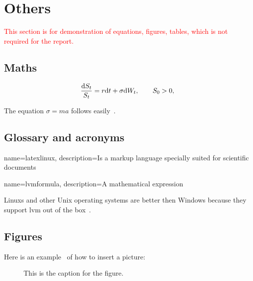 \section{Others}
\textcolor{red}{This section is for demonstration of equations, figures, tables, which is not required for the report.}
\subsection{Maths}
\begin{equation}\label{eq:BS}
\frac{\mathrm{d} S_t}{S_t} = r \mathrm{d} t + \sigma \mathrm{d} W_t,
\qquad S_0>0,
\end{equation}

The equation $\sigma = m a$ follows easily~\cite{Doe11}.


\subsection{Glossary and acronyms}

{
    name=latexlinux,
    description={Is a markup language specially suited for 
scientific documents}
}

{
    name=lvmformula,
    description={A mathematical expression}
}

\Glspl{Linux} and other Unix operating systems are better then Windows because they support \gls{lvm} out of the box~\cite{Joh11}. 

\subsection{Figures}
Here is an example~\cite{JohSil05} of how to insert a picture:

\begin{figure}[!ht]
\centering
{}
\caption{This is the caption for the figure.}
\label{fig:Pict}
\end{figure}


